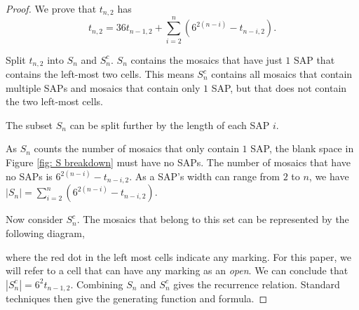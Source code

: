 \documentclass[12pt]{article}
\theoremstyle{plain}
\theoremstyle{definition}
\theoremstyle{remark}
\theoremstyle{definition}
\newcommand{\cellopen}[4]{ \draw[thick] ( #1 , #2 ) rectangle ( #3 , #4 ); \node[shape=circle,draw=red,fill=red, inner sep=0pt,minimum size=3pt] (A) at ( #1 * 0.5 + #3 * 0.5 , #2 * 0.5 + #4 * 0.5 ){};}
\newcommand{\cellA}[4]{ \draw[thick] ( #1 , #2 ) rectangle ( #3 , #4 ); \draw[red, thick] (#3 * 0.5 + #1 * 0.5 , #2) -- (#3, #4 * 0.5 + #2 * 0.5);}
\newcommand{\cellB}[4]{ \draw[thick] ( #1 , #2 ) rectangle ( #3 , #4 ); \draw[red, thick] (#3 * 0.5 + #1 * 0.5 , #2) -- (#1, #4 * 0.5 + #2 * 0.5);}
\newcommand{\cellC}[4]{ \draw[thick] ( #1 , #2 ) rectangle ( #3 , #4 ); \draw[red, thick] (#3 * 0.5 + #1 * 0.5 , #4) -- (#1, #4 * 0.5 + #2 * 0.5);}
\newcommand{\cellD}[4]{ \draw[thick] ( #1 , #2 ) rectangle ( #3 , #4 ); \draw[red, thick] (#3 * 0.5 + #1 * 0.5 , #4) -- (#3, #4 * 0.5 + #2 * 0.5);}
\newcommand{\cellF}[4]{ \draw[thick] ( #1 , #2 ) rectangle ( #3 , #4 ); \draw[red, thick] (#3, #4 * 0.5 + #2 * 0.5) -- (#1, #4 * 0.5 + #2 * 0.5);}
\begin{document}
\begin{proof}
We prove that $t_{n,2}$ has
$$t_{n,2} = 36t_{n-1,2} + \sum_{i=2}^{n}(6^{2(n-i)}-t_{n-i,2}).$$

Split $t_{n,2}$ into $S_n$ and $S_n^c$. $S_n$ contains the mosaics that have just $1$ SAP that contains the left-most two cells. This means $S_n^c$ contains all mosaics that contain multiple SAPs and mosaics that contain only $1$ SAP, but that does not contain the two left-most cells.

The subset $S_n$ can be split further by the length of each SAP $i$. 

\begin{center}
\end{center}

As $S_n$ counts the number of mosaics that only contain $1$ SAP, the blank space in Figure \ref{fig: S breakdown} must have no SAPs. The number of mosaics that have no SAPs is $6^{2(n-i)}-t_{n-i,2}$. As a SAP's width can range from $2$ to $n$, we have $|S_n| = \sum_{i=2}^{n}(6^{2(n-i)}-t_{n-i,2}).$

Now consider $S_n^c$. The mosaics that belong to this set can be represented by the following diagram,

\begin{center}
\label{fig: Sc breakdown}
\end{center}

where the red dot in the left most cells indicate any marking. For this paper, we will refer to a cell that can have any marking as an \textit{open}. We can conclude that $|S_n^c| = 6^{2}t_{n-1,2}$. Combining $S_n$ and $S_n^c$ gives the recurrence relation. Standard techniques then give the generating function and formula.
\end{proof}
\end{document}
